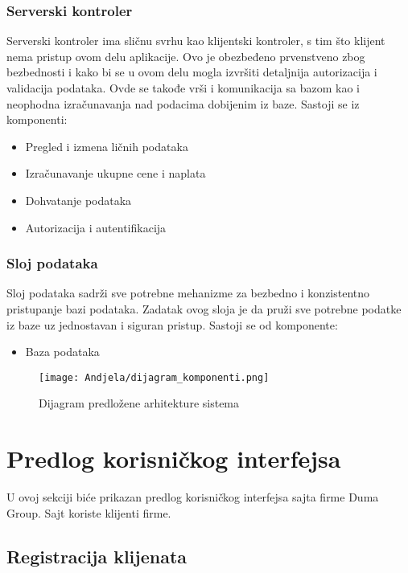 \documentclass[a4paper]{article}
\begin{document}
\subsubsection{Serverski kontroler}

Serverski kontroler ima sličnu svrhu kao klijentski kontroler, s tim što klijent nema pristup ovom delu aplikacije. Ovo je obezbeđeno prvenstveno zbog bezbednosti i kako bi se u ovom delu mogla izvršiti detaljnija autorizacija i validacija podataka. Ovde se takođe vrši i komunikacija sa bazom kao i neophodna izračunavanja nad podacima dobijenim iz baze. 
\newline
Sastoji se iz komponenti:
\begin{itemize}
\item Pregled i izmena ličnih podataka
\item Izračunavanje ukupne cene i naplata
\item Dohvatanje podataka
\item Autorizacija i autentifikacija
\end{itemize}


\subsubsection{Sloj podataka}
Sloj podataka sadrži sve potrebne mehanizme za bezbedno i konzistentno pristupanje bazi podataka. Zadatak ovog sloja je da pruži sve potrebne podatke iz baze uz jednostavan i siguran  pristup.\newline
Sastoji se od komponente:
\begin{itemize}
    \item Baza podataka
\end{itemize}

\begin{figure}[H]
    \centering
    \texttt{[image: Andjela/dijagram\_komponenti.png]}
    \caption{Dijagram predložene arhitekture sistema}
    \label{fig:dijagramTabela}
\end{figure}

\section{Predlog korisničkog interfejsa}

U ovoj sekciji biće prikazan predlog korisničkog interfejsa sajta firme Duma Group. Sajt koriste klijenti firme.

\subsection{Registracija klijenata}
\end{document}
